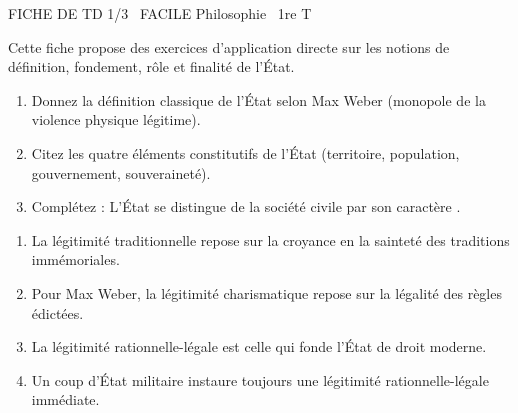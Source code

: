 \documentclass[11pt]{article}
\begin{document}
\begin{tcolorbox}[enhanced,colback=popink,colframe=popink,arc=10pt,boxrule=0pt,left=12pt,right=12pt,top=9pt,bottom=9pt]
{\color{white}\popxbold\small FICHE DE TD 1/3 \textbullet\ FACILE \hfill Philosophie \textbullet\ 1re T\par}
\end{tcolorbox}
\vspace{4pt}
Cette fiche propose des exercices d'application directe sur les notions de définition, fondement, rôle et finalité de l'État.

\begin{exercice}
\begin{enumerate}
    \item Donnez la définition classique de l'État selon Max Weber (monopole de la violence physique légitime).
    \item Citez les quatre éléments constitutifs de l'État (territoire, population, gouvernement, souveraineté).
    \item Complétez : L'État se distingue de la société civile par son caractère \underline{\hspace{4cm}}.
\end{enumerate}
\end{exercice}

\begin{exercice}
\begin{enumerate}
    \item La légitimité traditionnelle repose sur la croyance en la sainteté des traditions immémoriales.
    \item Pour Max Weber, la légitimité charismatique repose sur la légalité des règles édictées.
    \item La légitimité rationnelle-légale est celle qui fonde l'État de droit moderne.
    \item Un coup d'État militaire instaure toujours une légitimité rationnelle-légale immédiate.
\end{enumerate}
\end{exercice}
\end{document}
